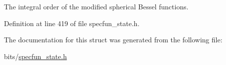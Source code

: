 The integral order of the modified spherical Bessel functions. 



Definition at line 419 of file specfun\+\_\+state.\+h.



The documentation for this struct was generated from the following file\+:\begin{DoxyCompactItemize}
\item 
bits/\hyperlink{specfun__state_8h}{specfun\+\_\+state.\+h}\end{DoxyCompactItemize}
